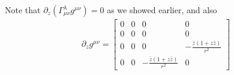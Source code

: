 \documentclass[12pt]{article}
\begin{document}
Note that $\partial_{z}(\Gamma^{\lambda}_{\mu\nu} g^{\mu\nu})  =0$ as we showed earlier, and also
\begin{gather}
\partial_{z}g^{\mu\nu}
=
\left[
\begin{array}{cccc}
0 & 0 & 0 & 0
\\
0 & 0 & 0 & 0
\\
0 & 0 & 0 & - \frac{\bar{z} (1 + z \bar{z})}{r^{2}}
\\
0 & 0 & - \frac{\bar{z} (1 + z \bar{z})}{r^{2}} & 0
\end{array}
\right]
\end{gather}
\end{document}
